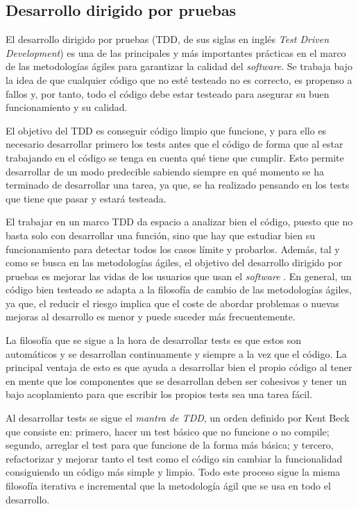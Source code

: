 \subsection{Desarrollo dirigido por pruebas}
El desarrollo dirigido por pruebas (TDD, de sus siglas en inglés \textit{Test Driven Development}) es una de las principales y más importantes prácticas en el marco de las metodologías ágiles para garantizar la calidad del \textit{software}. Se trabaja bajo la idea de que cualquier código que no esté testeado no es correcto, es propenso a fallos y, por tanto, todo el código debe estar testeado para asegurar su buen funcionamiento y su calidad.

El objetivo del TDD es conseguir código limpio que funcione, y para ello es necesario desarrollar primero los tests antes que el código de forma que al estar trabajando en el código se tenga en cuenta qué tiene que cumplir. Esto permite desarrollar de un modo predecible sabiendo siempre en qué momento se ha terminado de desarrollar una tarea, ya que, se ha realizado pensando en los tests que tiene que pasar y estará testeada. 

El trabajar en un marco TDD da espacio a analizar bien el código, puesto que no basta solo con desarrollar una función, sino que hay que estudiar bien su funcionamiento para detectar todos los casos límite y probarlos. Además, tal y como se busca en las metodologías ágiles, el objetivo del desarrollo dirigido por pruebas es mejorar las vidas de los usuarios que usan el \textit{software} \cite{beck2002driven}. En general, un código bien testeado se adapta a la filosofía de cambio de las metodologías ágiles, ya que, el reducir el riesgo implica que el coste de abordar problemas o nuevas mejoras al desarrollo es menor y puede suceder más frecuentemente.

La filosofía que se sigue a la hora de desarrollar tests es que estos son automáticos y se desarrollan continuamente y siempre a la vez que el código. La principal ventaja de esto es que ayuda a desarrollar bien el propio código al tener en mente que los componentes que se desarrollan deben ser cohesivos y tener un bajo acoplamiento para que escribir los propios tests sea una tarea fácil.

Al desarrollar tests se sigue el \textit{mantra de TDD}, un orden definido por Kent Beck \cite{beck2002driven} que consiste en: primero, hacer un test básico que no funcione o no compile; segundo, arreglar el test para que funcione de la forma más básica; y tercero, refactorizar y mejorar tanto el test como el código sin cambiar la funcionalidad consiguiendo un código más simple y limpio. Todo este proceso sigue la misma filosofía iterativa e incremental que la metodología ágil que se usa en todo el desarrollo.


